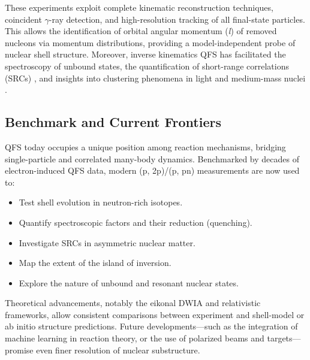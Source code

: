 These experiments exploit complete kinematic reconstruction techniques, coincident $\gamma$-ray detection, and high-resolution tracking of all final-state particles. This allows the identification of orbital angular momentum (\emph{l}) of removed nucleons via momentum distributions, providing a model-independent probe of nuclear shell structure. Moreover, inverse kinematics \gls{QFS} has facilitated the spectroscopy of unbound states, the quantification of short-range correlations (SRCs) \cite{hen_nucleon-nucleon_2017,duer_direct_2019,schmidt_probing_2020}, and insights into clustering phenomena in light and medium-mass nuclei \cite{marques_detection_2002,marques_quest_2021,duer_observation_2022}.


\subsection{Benchmark and Current Frontiers}

\gls{QFS} today occupies a unique position among reaction mechanisms, bridging single-particle and correlated many-body dynamics. Benchmarked by decades of electron-induced \gls{QFS} data, modern (p, 2p)/(p, pn) measurements are now used to:

\begin{itemize}
	\item Test shell evolution in neutron-rich isotopes.
	\item Quantify spectroscopic factors and their reduction (quenching).
	\item Investigate SRCs in asymmetric nuclear matter.
	\item Map the extent of the island of inversion.
	\item Explore the nature of unbound and resonant nuclear states.
\end{itemize}

Theoretical advancements, notably the eikonal DWIA and relativistic frameworks, allow consistent comparisons between experiment and shell-model or ab initio structure predictions. Future developments—such as the integration of machine learning in reaction theory, or the use of polarized beams and targets—promise even finer resolution of nuclear substructure.


%



